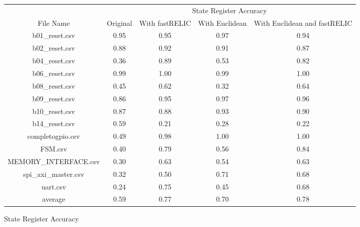 \bigskip\begin{tabular}{|c|c|c|c|c|}
    \hline
     & \multicolumn{4}{c|}{State Register Accuracy}\\
    \cline {2-5}
    File Name & Original & With fastRELIC & With Euclidean & With Euclidean and fastRELIC\\
    \hline
    \hline
    b01\_reset.csv & 0.95 & 0.95 & 0.97 & 0.94\\
    \hline
    b02\_reset.csv & 0.88 & 0.92 & 0.91 & 0.87\\
    \hline
    b04\_reset.csv & 0.36 & 0.89 & 0.53 & 0.82\\
    \hline
    b06\_reset.csv & 0.99 & 1.00 & 0.99 & 1.00\\
    \hline
    b08\_reset.csv & 0.45 & 0.62 & 0.32 & 0.64\\
    \hline
    b09\_reset.csv & 0.86 & 0.95 & 0.97 & 0.96\\
    \hline
    b10\_reset.csv & 0.87 & 0.88 & 0.93 & 0.90\\
    \hline
    b14\_reset.csv & 0.59 & 0.21 & 0.28 & 0.22\\
    \hline
    completogpio.csv & 0.49 & 0.98 & 1.00 & 1.00\\
    \hline
    FSM.csv & 0.40 & 0.79 & 0.56 & 0.84\\
    \hline
    MEMORY\_INTERFACE.csv & 0.30 & 0.63 & 0.54 & 0.63\\
    \hline
    spi\_axi\_master.csv & 0.32 & 0.50 & 0.71 & 0.68\\
    \hline
    uart.csv & 0.24 & 0.75 & 0.45 & 0.68\\
    \hline
    \hline
    average & 0.59 & 0.77 & 0.70 & 0.78\\
    \hline
\end{tabular}
\caption{State Register Accuracy}
\label{tab:State Register Accuracy after Step Feature Selection}
